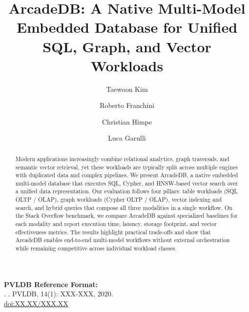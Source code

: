 \documentclass[sigconf, nonacm]{acmart}
\newcommand\vldbdoi{XX.XX/XXX.XX}
\newcommand\vldbpages{XXX-XXX}
\newcommand\vldbvolume{14}
\newcommand\vldbissue{1}
\newcommand\vldbyear{2020}
\newcommand\vldbauthors{\authors}
\newcommand\vldbtitle{\shorttitle}
\newcommand\vldbpagestyle{plain}
\begin{document}
\title{ArcadeDB: A Native Multi-Model Embedded Database for Unified SQL, Graph, and Vector Workloads}

\author{Taewoon Kim}

\author{Roberto Franchini}

\author{Christian Himpe}

\author{Luca Garulli}

\begin{abstract}
Modern applications increasingly combine relational analytics, graph traversals, and semantic vector retrieval, yet these workloads are typically split across multiple engines with duplicated data and complex pipelines. We present ArcadeDB, a native embedded multi-model database that executes SQL, Cypher, and HNSW-based vector search over a unified data representation. Our evaluation follows four pillars: table workloads (SQL OLTP / OLAP), graph workloads (Cypher OLTP / OLAP), vector indexing and search, and hybrid queries that compose all three modalities in a single workflow. On the Stack Overflow benchmark, we compare ArcadeDB against specialized baselines for each modality and report execution time, latency, storage footprint, and vector effectiveness metrics. The results highlight practical trade-offs and show that ArcadeDB enables end-to-end multi-model workflows without external orchestration while remaining competitive across individual workload classes.
\end{abstract}


\maketitle

\pagestyle{\vldbpagestyle}
\begingroup\small\noindent\raggedright\textbf{PVLDB Reference Format:}\\
\vldbauthors. \vldbtitle. PVLDB, \vldbvolume(\vldbissue): \vldbpages, \vldbyear.\\
\href{https://doi.org/\vldbdoi}{doi:\vldbdoi}
\endgroup
\begingroup
\end{document}
